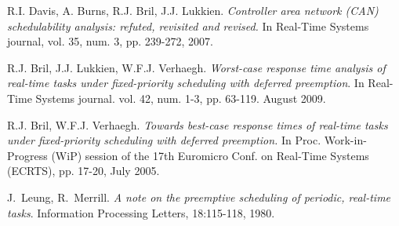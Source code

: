 \documentclass[conference,compsoc]{IEEEtran}
\begin{document}
\begin{thebibliography}{1}
R.I. Davis, A. Burns, R.J. Bril, J.J. Lukkien.
\textit{Controller area network (CAN) schedulability analysis: refuted, revisited and revised.}
In Real-Time Systems journal, 
vol. 35, num. 3, pp. 239-272, 2007.

R.J. Bril, J.J. Lukkien, W.F.J. Verhaegh.
\textit{Worst-case response time analysis of real-time tasks under fixed-priority scheduling with deferred preemption}.
In Real-Time Systems journal. vol. 42, num. 1-3, pp. 63-119. August 2009.

R.J. Bril, W.F.J. Verhaegh.
\textit{Towards best-case response times of real-time tasks under fixed-priority scheduling with deferred preemption.}
In Proc. Work-in-Progress (WiP) session of the 17th Euromicro Conf. on Real-Time Systems (ECRTS), pp. 17-20, July 2005.

J.~Leung, R.~Merrill. \textit{A note on the preemptive scheduling
	of periodic, real-time tasks}. 
Information Processing Letters,
18:115-118, 1980.

\end{thebibliography}




\end{document}
